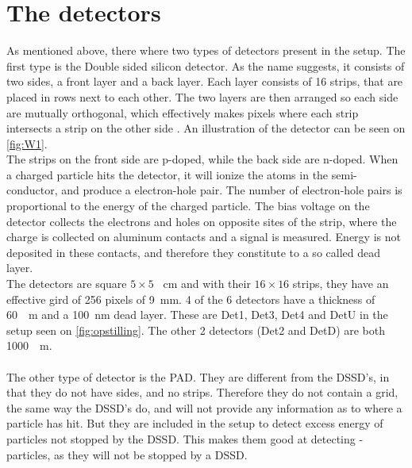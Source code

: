 \section{The detectors}
As mentioned above, there where two types of detectors present in the setup. The first type is the Double sided silicon detector. 
As the name suggests, it consists of two sides, a front layer and a back layer. Each layer consists of 16 strips, that are placed in rows next to each other. The two layers are then arranged so each side are mutually orthogonal, which effectively makes pixels where each strip intersects a strip on the other side \cite{TENGBLAD2004458}. An illustration of the detector can be seen on \cref{fig:W1}.\\
The strips on the front side are p-doped, while the back side are n-doped. When a charged particle hits the detector, it will ionize the atoms in the semi-conductor, and produce a electron-hole pair. The number of electron-hole pairs is proportional to the energy of the charged particle. 
The bias voltage on the detector collects the electrons and holes on opposite sites of the strip, where the charge is collected on aluminum contacts and a signal is measured. Energy is not deposited in these contacts, and therefore they constitute to a so called dead layer. \\
The detectors are square $5\times 5$ \SI{}{cm} and with their $16\times 16$ strips, they have an effective gird of  256 pixels of \SI{9}{mm}. 
4 of the 6 detectors have a thickness of \SI{60}{\mu m} and a \SI{100}{nm} dead layer. These  are Det1, Det3, Det4 and DetU in the setup seen on \cref{fig:opstilling}. The other 2 detectors (Det2 and DetD) are both \SI{1000}{\mu m}.
\\
\\
The other type of detector is the PAD. They are different from the DSSD's, in that they do not have sides, and no strips. Therefore they do not contain a grid, the same way the DSSD's do, and will not provide any information as to where a particle has hit. But they are included in the setup to detect excess energy of particles not stopped by the DSSD. This makes them good at detecting \be-particles, as they will not be stopped by a DSSD.

